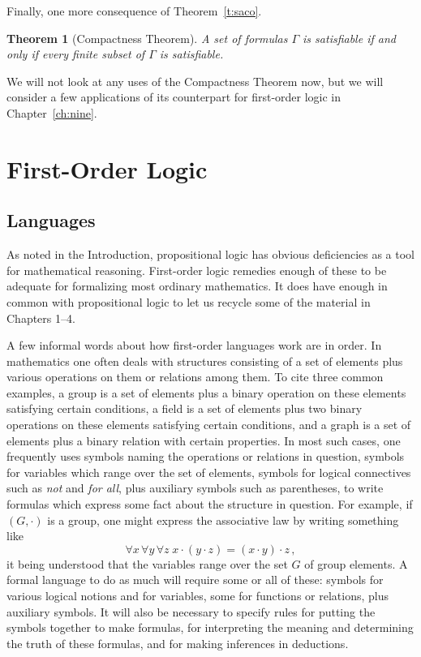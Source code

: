 \documentclass[12pt]{amsbook}
\theoremstyle{plain}
\newtheorem{thm}{Theorem}[chapter]
\theoremstyle{definition}
\theoremstyle{remark}
\begin{document}
Finally,  one more consequence of Theorem~\ref{t:saco}.  

\begin{thm}[Compactness Theorem] \label{t:pcpct} 
A set of formulas $\Gamma$ is satisfiable if and only if every finite subset of $\Gamma$ is satisfiable.
\end{thm}

We will not look at any uses of the Compactness Theorem now,  but we will consider a few applications of its counterpart for first-order logic in Chapter~\ref{ch:nine}.


\part*{First-Order Logic}


%
%

\chapter{Languages} \label{ch:five}

As noted in the Introduction,  propositional logic has obvious deficiencies as a tool for mathematical reasoning.  First-order logic remedies enough of these to be adequate for formalizing most ordinary mathematics.  It does have enough in common with propositional logic to let us recycle some of the material in Chapters 1--4.  

A few informal words about how first-order languages work are in order.  In mathematics one often deals with structures consisting of a set of elements plus various operations on them or relations among them.  To cite three common examples,  a group is a set of elements plus a binary operation on these elements satisfying certain conditions,  a field is a set of elements plus two binary operations on these elements satisfying certain conditions,  and a graph is a set of elements plus a binary relation with certain properties.  In most such cases,  one frequently uses symbols naming the operations or relations in question,  symbols for variables which range over the set of elements,  symbols for logical connectives such as {\em not\/} and {\em for all\/},  plus auxiliary symbols such as parentheses,  to write formulas which express some fact about the structure in question.  For example,  if $(G,\cdot)$ is a group,  one might express the associative law by writing something like
\[
\forall x\, \forall y\, \forall z\; x\cdot (y\cdot z) = (x\cdot y)\cdot z\, ,
\]
it being understood that the variables range over the set $G$ of group elements.  A formal language to do as much will require some or all of these: symbols for various logical notions and for variables,  some for functions or relations,  plus auxiliary symbols.  It will also be necessary to specify rules for putting the symbols together to make formulas,  for interpreting the meaning and determining the truth of these formulas,  and for making inferences in deductions.
\end{document}
